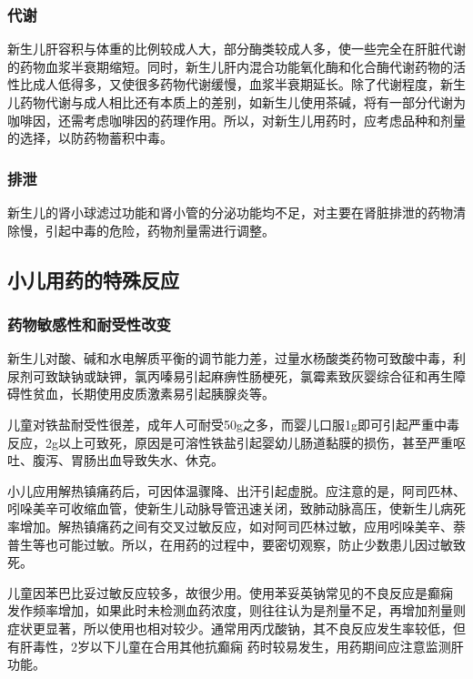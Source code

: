 \subsubsection{代谢}

新生儿肝容积与体重的比例较成人大，部分酶类较成人多，使一些完全在肝脏代谢的药物血浆半衰期缩短。同时，新生儿肝内混合功能氧化酶和化合酶代谢药物的活性比成人低得多，又使很多药物代谢缓慢，血浆半衰期延长。除了代谢程度，新生儿药物代谢与成人相比还有本质上的差别，如新生儿使用茶碱，将有一部分代谢为咖啡因，还需考虑咖啡因的药理作用。所以，对新生儿用药时，应考虑品种和剂量的选择，以防药物蓄积中毒。

\subsubsection{排泄}

新生儿的肾小球滤过功能和肾小管的分泌功能均不足，对主要在肾脏排泄的药物清除慢，引起中毒的危险，药物剂量需进行调整。

\subsection{小儿用药的特殊反应}

\subsubsection{药物敏感性和耐受性改变}

新生儿对酸、碱和水电解质平衡的调节能力差，过量水杨酸类药物可致酸中毒，利尿剂可致缺钠或缺钾，氯丙嗪易引起麻痹性肠梗死，氯霉素致灰婴综合征和再生障碍性贫血，长期使用皮质激素易引起胰腺炎等。

儿童对铁盐耐受性很差，成年人可耐受50g之多，而婴儿口服1g即可引起严重中毒反应，2g以上可致死，原因是可溶性铁盐引起婴幼儿肠道黏膜的损伤，甚至严重呕吐、腹泻、胃肠出血导致失水、休克。

小儿应用解热镇痛药后，可因体温骤降、出汗引起虚脱。应注意的是，阿司匹林、吲哚美辛可收缩血管，使新生儿动脉导管迅速关闭，致肺动脉高压，使新生儿病死率增加。解热镇痛药之间有交叉过敏反应，如对阿司匹林过敏，应用吲哚美辛、萘普生等也可能过敏。所以，在用药的过程中，要密切观察，防止少数患儿因过敏致死。

儿童因苯巴比妥过敏反应较多，故很少用。使用苯妥英钠常见的不良反应是癫痫
发作频率增加，如果此时未检测血药浓度，则往往认为是剂量不足，再增加剂量则症状更显著，所以使用也相对较少。通常用丙戊酸钠，其不良反应发生率较低，但有肝毒性，2岁以下儿童在合用其他抗癫痫
药时较易发生，用药期间应注意监测肝功能。

